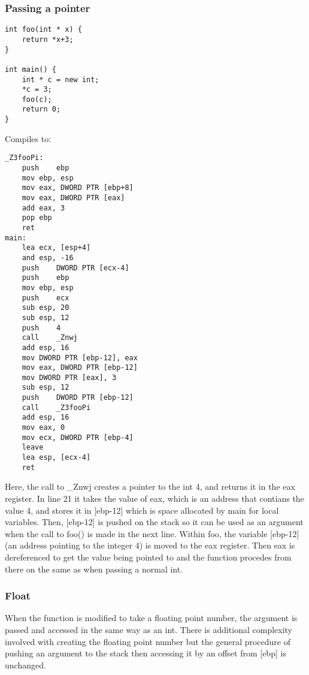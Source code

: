 \documentclass{article}
\begin{document}
\subsubsection*{Passing a pointer}
\begin{lstlisting}
int foo(int * x) {
    return *x+3;
}

int main() {
    int * c = new int;
    *c = 3;
    foo(c);
    return 0;
}
\end{lstlisting}
Compiles to:
\begin{lstlisting}
_Z3fooPi:
	push	ebp
	mov	ebp, esp
	mov	eax, DWORD PTR [ebp+8]
	mov	eax, DWORD PTR [eax]
	add	eax, 3
	pop	ebp
	ret
main:
	lea	ecx, [esp+4]
	and	esp, -16
	push	DWORD PTR [ecx-4]
	push	ebp
	mov	ebp, esp
	push	ecx
	sub	esp, 20
	sub	esp, 12
	push	4
	call	_Znwj
	add	esp, 16
	mov	DWORD PTR [ebp-12], eax
	mov	eax, DWORD PTR [ebp-12]
	mov	DWORD PTR [eax], 3
	sub	esp, 12
	push	DWORD PTR [ebp-12]
	call	_Z3fooPi
	add	esp, 16
	mov	eax, 0
	mov	ecx, DWORD PTR [ebp-4]
	leave
	lea	esp, [ecx-4]
	ret
\end{lstlisting}
Here, the call to \_Znwj creates a pointer to the int 4, and returns it in the eax register. In line 21 it takes the value of eax, which is an address that contians the value 4, and stores it in [ebp-12] which is space allocated by main for local variables. Then, [ebp-12] is pushed on the stack so it can be used as an argument when the call to foo() is made in the next line. Within foo, the variable [ebp-12] (an address pointing to the integer 4) is moved to the eax register. Then eax is dereferenced to get the value being pointed to and the function procedes from there on the same as when passing a normal int.

\subsubsection*{Float}
When the function is modified to take a floating point number, the argument is passed and accessed in the same way as an int. There is additional complexity involved with creating the floating point number but the general procedure of pushing an argument to the stack then accessing it by an offset from [ebp] is unchanged. 
\end{document}
